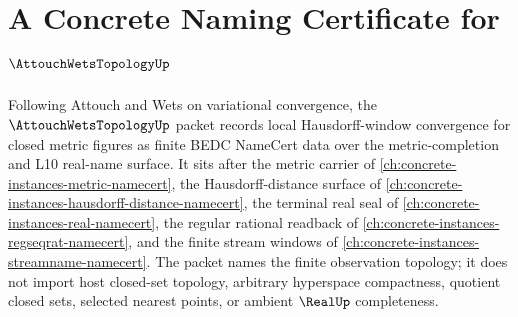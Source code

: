 \chapter{A Concrete Naming Certificate for $\AttouchWetsTopologyUp$}
\label{ch:concrete-instances-attouch-wets-topology-namecert}

Following Attouch and Wets on variational convergence, the $\AttouchWetsTopologyUp$ packet records local Hausdorff-window convergence for closed metric figures as finite BEDC NameCert data over the metric-completion and L10 real-name surface. It sits after the metric carrier of \autoref{ch:concrete-instances-metric-namecert}, the Hausdorff-distance surface of \autoref{ch:concrete-instances-hausdorff-distance-namecert}, the terminal real seal of \autoref{ch:concrete-instances-real-namecert}, the regular rational readback of \autoref{ch:concrete-instances-regseqrat-namecert}, and the finite stream windows of \autoref{ch:concrete-instances-streamname-namecert}. The packet names the finite observation topology; it does not import host closed-set topology, arbitrary hyperspace compactness, quotient closed sets, selected nearest points, or ambient $\RealUp$ completeness.

